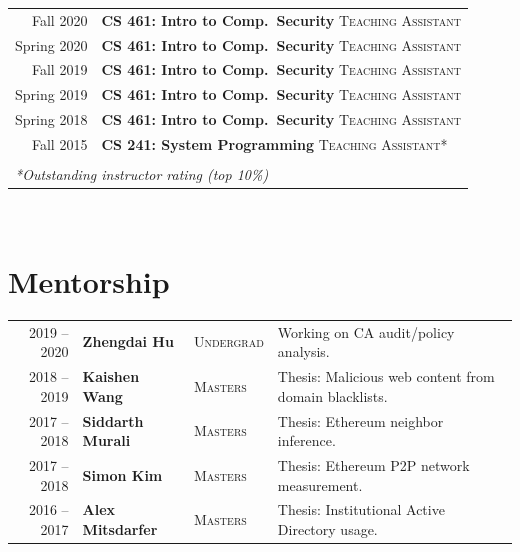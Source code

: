 \documentclass[10pt,singlecolumn]{article} %
\begin{document}
\begin{tabular}{rl}
Fall 2020    & \textbf{CS 461: Intro to Comp.\ Security} \textsc{Teaching Assistant}\\ 
Spring 2020	 & \textbf{CS 461: Intro to Comp.\ Security} \textsc{Teaching Assistant}\\ 
Fall 2019	 & \textbf{CS 461: Intro to Comp.\ Security} \textsc{Teaching Assistant}\\
Spring 2019	 & \textbf{CS 461: Intro to Comp.\ Security} \textsc{Teaching Assistant}\\  
Spring 2018	 & \textbf{CS 461: Intro to Comp.\ Security} \textsc{Teaching Assistant}\\ 
Fall 2015	 & \textbf{CS 241: System Programming} \textsc{Teaching Assistant*}\\ \\
\multicolumn{2}{l}{\textit{*Outstanding instructor rating (top 10\%)}}
\end{tabular}\\[10pt]



\section{Mentorship} 
\begin{tabular}{rlll}
2019 -- 2020	 & \textbf{Zhengdai Hu} & \textsc{Undergrad} & Working on CA audit/policy analysis.\\ 
2018 -- 2019	 & \textbf{Kaishen Wang} & \textsc{Masters} & Thesis: Malicious web content from domain blacklists.\\
2017 -- 2018	 & \textbf{Siddarth Murali} & \textsc{Masters} & Thesis: Ethereum neighbor inference.\\ 
2017 -- 2018	 & \textbf{Simon Kim} & \textsc{Masters} & Thesis: Ethereum P2P network measurement.\\  
2016 -- 2017	 & \textbf{Alex Mitsdarfer} & \textsc{Masters} & Thesis: Institutional Active Directory usage.\\ 
\end{tabular}\\[10pt]



\end{document}
